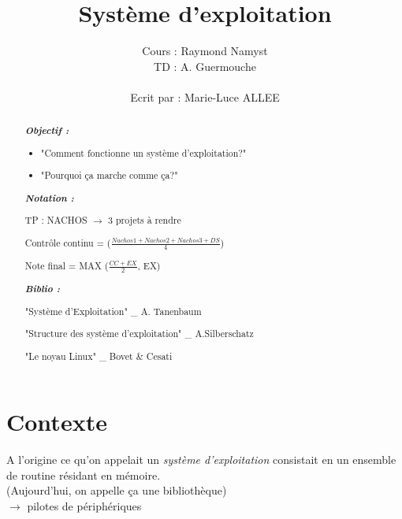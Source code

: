 \documentclass[12pt,a4paper]{report}
\begin{document}
\title{Système d'exploitation\\}
\author{Cours : Raymond Namyst \\ TD : A. Guermouche\\\\ Ecrit par : Marie-Luce ALLEE\\}
\maketitle

\begin{abstract}

\textbf{\textit{Objectif :}} \\
\begin{itemize}
\item "Comment fonctionne un système d'exploitation?"
\item "Pourquoi ça marche comme ça?"
\end{itemize}

\vspace*{2cm}

\textbf{\textit{Notation :} }\\
\begin{description}
\item TP : NACHOS $\rightarrow$ 3 projets à rendre
\item Contrôle continu = ($\frac{Nachos 1 + Nachos 2+ Nachos 3 + DS}{4}$)
\item Note final = MAX ($\frac{CC + EX}{2}$, EX)
\end{description}

\vspace*{2 cm}

\textbf{\textit{Biblio :} }\\
\begin{description}
\item "Système d'Exploitation"  \_ A. Tanenbaum
\item "Structure des système d'exploitation" \_ A.Silberschatz
\item "Le noyau Linux" \_ Bovet \& Cesati
\end{description}

\end{abstract}

\tableofcontents
\newpage

\section*{Contexte}
A l'origine ce qu'on appelait un \textit{système d'exploitation} consistait en un ensemble de routine résidant en mémoire.\\
(Aujourd'hui, on appelle ça une bibliothèque)\\
$\rightarrow$ pilotes de périphériques\\
\end{document}

